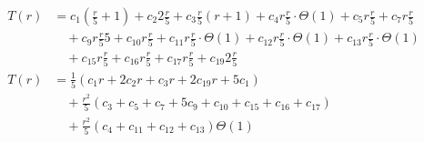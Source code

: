 \begin{subequations}
\label{eq:findedgels1}
\begin{align}
\label{eq:findedgels1-1}
T(r)& =
c_{1}(\frac{r}{5} + 1)
+ c_{2}2\frac{r}{5}
+ c_{3}\frac{r}{5}(r + 1)
+ c_{4}r\frac{r}{5} \cdot \Theta(1)
+ c_{5}r\frac{r}{5}
+ c_{7}r\frac{r}{5}
\\
& \quad
+ c_{9}r\frac{r}{5}5
+ c_{10}r\frac{r}{5}
+ c_{11}r\frac{r}{5} \cdot \Theta(1)
+ c_{12}r\frac{r}{5} \cdot \Theta(1)
+ c_{13}r\frac{r}{5} \cdot \Theta(1)
\nonumber \\
& \quad
+ c_{15}r\frac{r}{5}
+ c_{16}r\frac{r}{5}
+ c_{17}r\frac{r}{5}
+ c_{19}2\frac{r}{5}
\nonumber \\
\label{eq:findedgels1-2}
T(r)& =
\frac{1}{5}(c_{1}r + 2c_{2}r + c_{3}r + 2c_{19}r + 5c_{1})
\\
& \quad
+  \frac{r^2}{5}(c_{3} + c_{5} + c_{7} + 5c_{9} + c_{10} + c_{15} + c_{16} + c_{17})
\nonumber \\
& \quad
+ \frac{r^2}{5}(c_{4} + c_{11} + c_{12} + c_{13}) \Theta(1)
\nonumber
\end{align}
\end{subequations}

